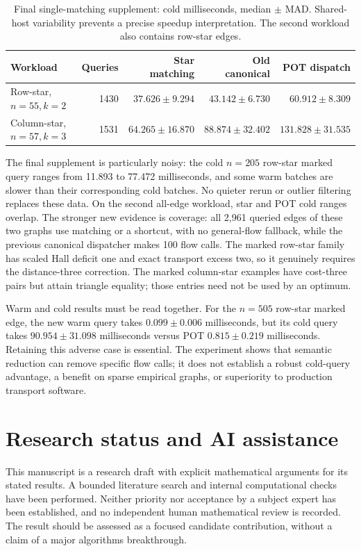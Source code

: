 \documentclass[11pt]{article}
\theoremstyle{remark}
\begin{document}
\begin{table}[ht]
\centering\small
\begin{tabular}{lrrrr}
\toprule
Workload & Queries & Star matching & Old canonical & POT dispatch\\
\midrule
Row-star, $n=55,k=2$ &1430&$37.626\pm9.294$&$43.142\pm6.730$&$60.912\pm8.309$\\
Column-star, $n=57,k=3$ &1531&$64.265\pm16.870$&$88.874\pm32.402$&$131.828\pm31.535$\\
\bottomrule
\end{tabular}
\caption{Final single-matching supplement: cold milliseconds, median $\pm$ MAD. Shared-host variability prevents a precise speedup interpretation. The second workload also contains row-star edges.}
\label{tab:stars}
\end{table}

The final supplement is particularly noisy: the cold $n=205$ row-star marked query ranges from 11.893 to 77.472 milliseconds, and some warm batches are slower than their corresponding cold batches. No quieter rerun or outlier filtering replaces these data. On the second all-edge workload, star and POT cold ranges overlap. The stronger new evidence is coverage: all 2,961 queried edges of these two graphs use matching or a shortcut, with no general-flow fallback, while the previous canonical dispatcher makes 100 flow calls. The marked row-star family has scaled Hall deficit one and exact transport excess two, so it genuinely requires the distance-three correction. The marked column-star examples have cost-three pairs but attain triangle equality; those entries need not be used by an optimum.

Warm and cold results must be read together. For the $n=505$ row-star marked edge, the new warm query takes $0.099\pm0.006$ milliseconds, but its cold query takes $90.954\pm31.098$ milliseconds versus POT $0.815\pm0.219$ milliseconds. Retaining this adverse case is essential. The experiment shows that semantic reduction can remove specific flow calls; it does not establish a robust cold-query advantage, a benefit on sparse empirical graphs, or superiority to production transport software.

\section{Research status and AI assistance}\label{sec:status}

This manuscript is a research draft with explicit mathematical arguments for its stated results. A bounded literature search and internal computational checks have been performed. Neither priority nor acceptance by a subject expert has been established, and no independent human mathematical review is recorded. The result should be assessed as a focused candidate contribution, without a claim of a major algorithms breakthrough.
\end{document}

